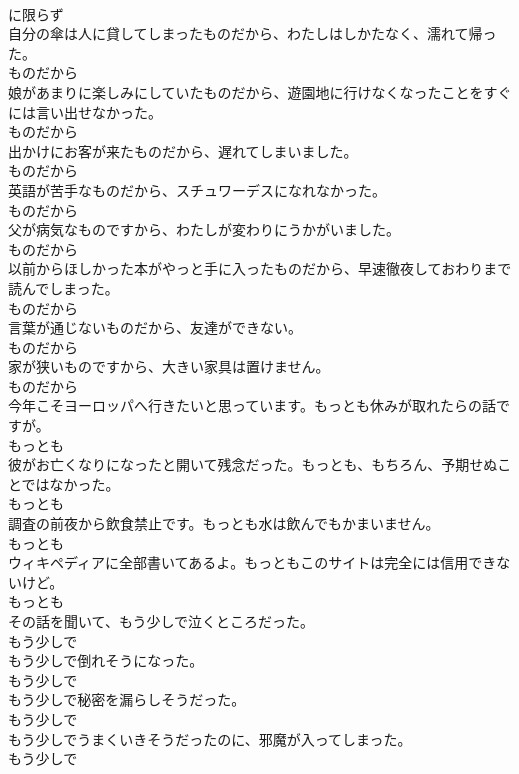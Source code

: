 \documentclass[8pt]{extreport}
\begin{document}
\begin{CJK}{UTF8}{min}
\\	に限らず
\\	自分の傘は人に貸してしまったものだから、わたしはしかたなく、濡れて帰った。	
\\	ものだから
\\	娘があまりに楽しみにしていたものだから、遊園地に行けなくなったことをすぐには言い出せなかった。	
\\	ものだから
\\	出かけにお客が来たものだから、遅れてしまいました。	
\\	ものだから
\\	英語が苦手なものだから、スチュワーデスになれなかった。	
\\	ものだから
\\	父が病気なものですから、わたしが変わりにうかがいました。	
\\	ものだから
\\	以前からほしかった本がやっと手に入ったものだから、早速徹夜しておわりまで読んでしまった。	
\\	ものだから
\\	言葉が通じないものだから、友達ができない。	
\\	ものだから
\\	家が狭いものですから、大きい家具は置けません。	
\\	ものだから
\\	今年こそヨーロッパへ行きたいと思っています。もっとも休みが取れたらの話ですが。	
\\	もっとも
\\	彼がお亡くなりになったと開いて残念だった。もっとも、もちろん、予期せぬことではなかった。	
\\	もっとも
\\	調査の前夜から飲食禁止です。もっとも水は飲んでもかまいません。	
\\	もっとも
\\	ウィキペディアに全部書いてあるよ。もっともこのサイトは完全には信用できないけど。	
\\	もっとも
\\	その話を聞いて、もう少しで泣くところだった。	
\\	もう少しで
\\	もう少しで倒れそうになった。	
\\	もう少しで
\\	もう少しで秘密を漏らしそうだった。	
\\	もう少しで
\\	もう少しでうまくいきそうだったのに、邪魔が入ってしまった。	
\\	もう少しで

\end{CJK}
\end{document}
